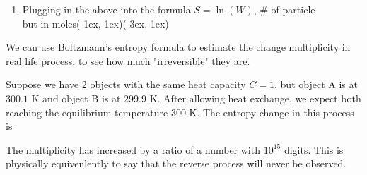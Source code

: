 \documentclass[class=article, crop=false, 12pt]{standalone}
\begin{document}
\begin{enumerate}
    \item Plugging in the above into the formula $S=\ln(W)$,
    {\scriptsize \# of particle\\[-1ex]\scriptsize but in moles}{(-1ex,-1ex)}{(-3ex,-1ex)}
\end{enumerate}

\newpage
\begin{example}
    We can use Boltzmann's entropy formula to estimate the change multiplicity in real life process,
    to see how much "irreversible" they are.

    Suppose we have 2 objects with the same heat capacity $C=1$,
    but object A is at $300.1$ K and object B is at $299.9$ K.
    After allowing heat exchange,
    we expect both reaching the equilibrium temperature $300$ K.
    The entropy change in this process is 

    The multiplicity has increased by a ratio of a number with $10^{15}$ digits.
    This is physically equivenlently to say that the reverse process will never be observed.
\end{example}
\end{document}
